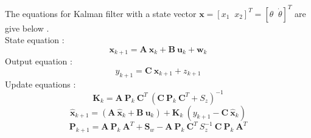 The equations for Kalman filter with a state vector $\bm{x} = [x_1\;\;x_2]^T = [\theta\;\;\dot{\theta}]^T$ are give below \cite{kalman_book}.\\

State equation :
\begin{equation}
\label{eqn:5_kalmanstate}
\bm{x}_{k+1} = \bm{A}\:\bm{x}_k + \bm{B}\:\bm{u}_k + \bm{w}_k
\end{equation}
Output equation :
\begin{equation}
\label{eqn:5_kalmanop}
y_{k+1} = \bm{C}\:\bm{x}_{k+1} + z_{k+1}
\end{equation}
Update equations :
\begin{equation}
\label{eqn:5_kalmanK}
\bm{K}_k = \bm{A}\:\bm{P}_k\:\bm{C}^T\:\left( \bm{C}\:\bm{P}_k\:\bm{C}^T + S_z\right)^{-1}
\end{equation}
\begin{equation}
\label{eqn:5_kalmanhat}
\hat{\bm{x}}_{k+1} = \left( \bm{A}\:\hat{\bm{x}}_k + \bm{B}\:\bm{u}_k \right ) + \bm{K}_k\:\left ( y_{k+1} - \bm{C}\:\hat{\bm{x}}_k\right)
\end{equation}
\begin{equation}
\label{eqn:5_kalmanP}
\bm{P}_{k+1} = \bm{A}\:\bm{P}_k\:\bm{A}^T + \bm{S}_w - \bm{A}\:\bm{P}_k\:\bm{C}^T\:S_z^{-1}\:\bm{C}\:\bm{P}_k\:\bm{A}^T
\end{equation}

